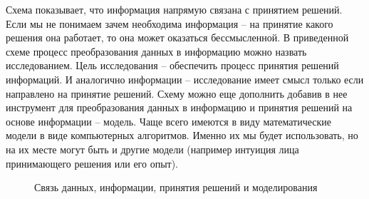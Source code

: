 Схема показывает, что информация напрямую связана с принятием решений. Если мы не понимаем зачем необходима информация -- на принятие какого решения она работает, то она может оказаться бессмысленной. В приведенной схеме процесс преобразования данных в информацию можно назвать исследованием. 
Цель исследования -- обеспечить процесс принятия решений информаций. И аналогично информации -- исследование имеет смысл только если направлено на принятие решений. 
Схему можно еще дополнить добавив в нее инструмент для преобразования данных в информацию и принятия решений на основе информации -- модель. Чаще всего имеются в виду математические модели в виде компьютерных алгоритмов. Именно их мы будет использовать, но на их месте могут быть и другие модели (например интуиция лица принимающего решения или его опыт). 

\begin{figure}[h!]
	\begin{center}
		
		\caption{Связь данных, информации, принятия решений и моделирования}
		\label{ris:data_model_chart_1}
	\end{center}
\end{figure}

